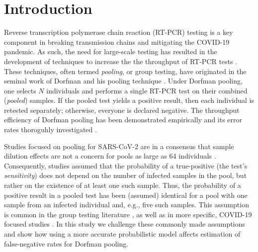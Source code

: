\documentclass{article}
\begin{document}
\section*{Introduction}
Reverse transcription polymerase chain reaction (RT-PCR) testing is a
key component in breaking transmission chains and mitigating the
COVID-19 pandemic. As such, the need for large-scale testing has
resulted in the development of techniques to increase the the
throughput of RT-PCR tests \cite{DorfmanYuvalDor, PoolSize30,
  BayesianDorfman, MatrixPooling, LionDorfman}. These techniques,
often termed \emph{pooling}, or group testing, have originated in the
seminal work of Dorfman and his pooling technique
\cite{DorfmanOriginal, DorfmanYuvalDor}. Under Dorfman pooling, one
selects $N$ individuals and performs a single RT-PCR test on their
combined (\emph{pooled}) samples. If the pooled test yields a positive
result, then each individual is retested separately; otherwise,
everyone is declared negative. The throughput efficiency of Dorfman
pooling has been demonstrated empirically \cite{DorfmanYuvalDor} and
its error rates thoroguhly investigated \cite{Kim, Simplistic1,
  OptimalDorfmanPool}.

Studies focused on pooling for SARS-CoV-2 are in a consensus that
sample dilution effects \cite{DilutionHIV, GroupDilution} are not a
concern for pools as large as 64 individuals \cite{PoolSize30, Lion,
  DorfmanYuvalDor, DilutionCOVID}. Consequently, studies assumed that
the probability of a true-positive (the test's \emph{sensitivity})
does not depend on the number of infected samples in the pool, but
rather on the existence of at least one such sample. Thus, the
probability of a positive result in a pooled test has been (assumed)
identical for a pool with one sample from an infected individual and,
e.g., five such samples. This assumption is common in the group
testing literature \cite{Kim, OptimalDorfmanPool}, as well as in more
specific, COVID-19 focused studies \cite{Simplistic1, Simplistic2}. In
this study we challenge these commonly made assumptions and show how
using a more accurate probabilistic model affects estimation of
false-negative rates for Dorfman pooling.

\end{document}
